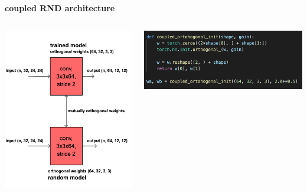 \documentclass[xcolor=dvipsnames]{beamer}
\begin{document}
\begin{frame}{\bf coupled RND architecture}

\begin{columns}

    \begin{column}{0.5\textwidth}
      \includegraphics[scale=0.18]{../diagrams/rnd/coupledrnd.png}
    \end{column}

    \begin{column}{0.5\textwidth}
      \includegraphics[scale=0.32]{../images/coupled_orthogonal.png}
    \end{column}

\end{columns}


\end{frame}
\end{document}
